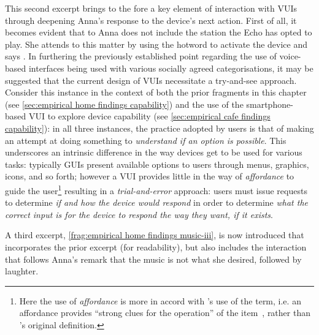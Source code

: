 \begin{revisedsubmission}
This second excerpt brings to the fore a key element of interaction with \acp{VUI} through deepening Anna's response to the device's next action.
First of all, it becomes evident that to Anna  does not include the  station the Echo has opted to play.
She attends to this matter by using the hotword to activate the device and says .
In furthering the previously established point regarding the use of voice-based interfaces being used with various socially agreed categorisations, it may be suggested that the current design of \acp{VUI} necessitate a try-and-see approach.
Consider this instance in the context of both the prior fragments in this chapter (see \ref{sec:empirical home findings capability}) and the use of the smartphone-based \ac{VUI} to explore device capability (see \ref{sec:empirical cafe findings capability}): in all three instances, the practice adopted by users is that of making an attempt at doing something to \textit{understand if an option is possible}.
This underscores an intrinsic difference in the way devices get to be used for various tasks: typically \acp{GUI} present available options to users through menus, graphics, icons, and so forth; however a \ac{VUI} provides little in the way of \textit{affordance} to guide the user\footnote{Here the use of \textit{affordance} is more in accord with \citet{Norman1988}'s use of the term, i.e. an affordance provides ``strong clues for the operation'' of the item~\citep[p. 9]{Norman1988}, rather than \citet{Gibson1979}'s original definition.} resulting in a \textit{trial-and-error} approach: users must issue requests to determine \textit{if and how the device would respond} in order to determine \textit{what the correct input is for the device to respond the way they want, if it exists}.

A third excerpt, \autoref{frag:empirical home findings music-iii}, is now introduced that incorporates the prior excerpt (for readability), but also includes the interaction that follows Anna's remark that the music is not what she desired, followed by laughter.
\end{revisedsubmission}


